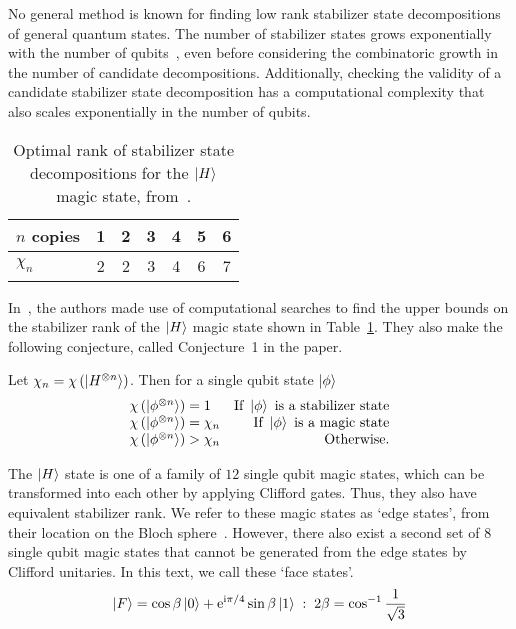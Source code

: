 No general method is known for finding low rank stabilizer state decompositions of general quantum states. The number of stabilizer states grows exponentially with the number of qubits~\cite{Aaronson2004}, even before considering the combinatoric growth in the number of candidate decompositions. Additionally, checking the validity of a candidate stabilizer state decomposition has a computational complexity that also scales exponentially in the number of qubits.\par
\begin{table}[b]
\centering
\begin{tabular}{|l|c|c|c|c|c|c|}
\hline
$n$ copies & 1 & 2 & 3 & 4 & 5 & 6 \\
\hline
$\chi_{n}$ & 2 & 2 & 3 & 4 & 6 & 7\\
\hline
\end{tabular}
\caption{Optimal rank of stabilizer state decompositions for the $\ket{H}$ magic state, from~\cite{Bravyi2015}.}
\label{tab:bss_h_rank}
\end{table}
In~\cite{Bravyi2015}, the authors made use of computational searches to find the upper bounds on the stabilizer rank of the $\ket{H}$ magic state shown in Table~\ref{tab:bss_h_rank}. They also make the following conjecture, called Conjecture~1 in the paper.
\begin{conj}
Let $\chi_{n}=\chi\left(\ket{H^{\otimes n}}\right)$. Then for a single qubit state $\ket{\phi}$
\[
\begin{array}{lr}
\chi\left(\ket{\phi^{\otimes n}}\right) = 1 & \text{If }\ket{\phi}\text{ is a stabilizer state}\\
\chi\left(\ket{\phi^{\otimes n}}\right) = \chi_{n} & \text{If }\ket{\phi}\text{ is a magic state}\\
\chi\left(\ket{\phi^{\otimes n}}\right) > \chi_{n} & \text{Otherwise.}
\end{array}
\]
\label{conj:magic_srank}
\end{conj}
The $\ket{H}$ state is one of a family of $12$ single qubit magic states, which can be transformed into each other by applying Clifford gates. Thus, they also have equivalent stabilizer rank. We refer to these magic states as `edge states', from their location on the Bloch sphere~\cite{Bravyi2005}. However, there also exist a second set of $8$ single qubit magic states that cannot be generated from the edge states by Clifford unitaries. In this text, we call these `face states'.
\begin{equation}
\ket{F} = \cos{\beta}\ket{0}+\mathrm{e}^{\mathrm{i} \pi/4}\sin{\beta}\ket{1} \;:\;2\beta=\cos^{-1}{\frac{1}{\sqrt{3}}}
\label{eq:face_state}
\end{equation}
